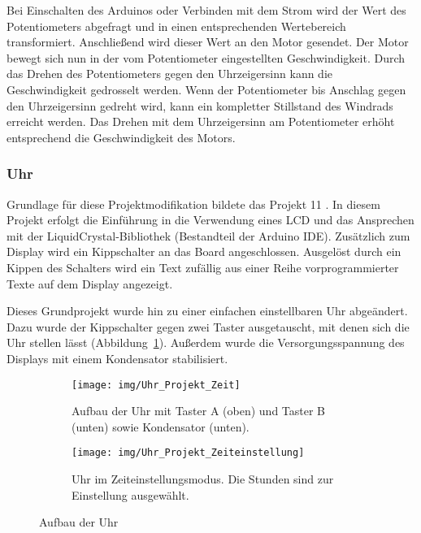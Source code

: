 

Bei Einschalten des Arduinos oder Verbinden mit dem Strom wird der Wert des Potentiometers abgefragt und in einen entsprechenden Wertebereich transformiert. Anschließend wird dieser Wert an den Motor gesendet. Der Motor bewegt sich nun in der vom Potentiometer eingestellten Geschwindigkeit. Durch das Drehen des Potentiometers gegen den Uhrzeigersinn kann die Geschwindigkeit gedrosselt werden. Wenn der Potentiometer bis Anschlag gegen den Uhrzeigersinn gedreht wird, kann ein kompletter Stillstand des Windrads erreicht werden. Das Drehen mit dem Uhrzeigersinn am Potentiometer erhöht entsprechend die Geschwindigkeit des Motors.


\subsubsection{Uhr}
Grundlage für diese Projektmodifikation bildete das Projekt 11 \autocite{arduino}. In diesem Projekt erfolgt die Einführung in die Verwendung eines LCD und das Ansprechen mit der LiquidCrystal-Bibliothek (Bestandteil der Arduino IDE).
Zusätzlich zum Display wird ein Kippschalter an das Board angeschlossen. Ausgelöst durch ein Kippen des Schalters wird ein Text zufällig aus einer Reihe vorprogrammierter Texte auf dem Display angezeigt.

Dieses Grundprojekt wurde hin zu einer einfachen einstellbaren Uhr abgeändert. Dazu wurde der Kippschalter gegen zwei Taster ausgetauscht, mit denen sich die Uhr stellen lässt (Abbildung~\ref{fig:zeit}). Außerdem wurde die Versorgungsspannung des Displays mit einem Kondensator stabilisiert.

\begin{figure}[h]
    \centering
    \begin{subfigure}[b]{0.48\linewidth}
        \centering
        \texttt{[image: img/Uhr\_Projekt\_Zeit]}
        \caption{Aufbau der Uhr mit Taster A (oben) und Taster B (unten) sowie Kondensator (unten).}\label{fig:zeit}
    \end{subfigure}\enspace%
    \begin{subfigure}[b]{0.48\linewidth}
        \centering
        \texttt{[image: img/Uhr\_Projekt\_Zeiteinstellung]}
        \caption{Uhr im Zeiteinstellungsmodus. Die Stunden sind zur Einstellung ausgewählt.}\label{fig:zeiteinstell}
    \end{subfigure}
    \caption{Aufbau der Uhr}\label{fig:uhr}
\end{figure}


